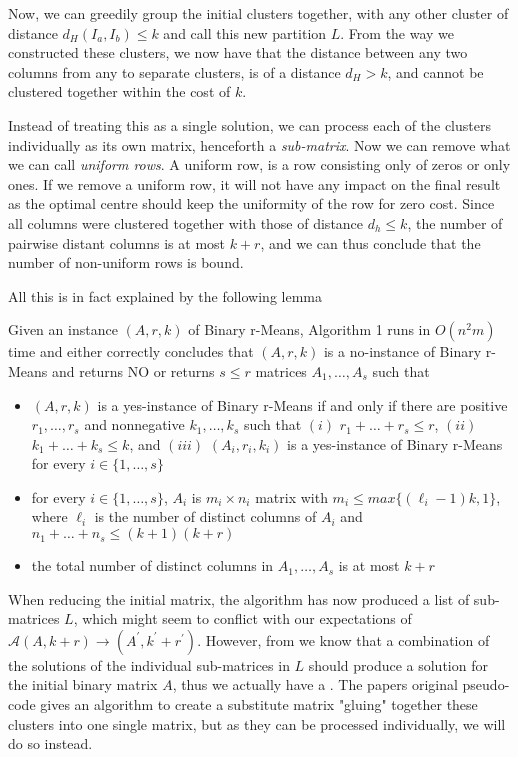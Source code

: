 \documentclass[a4paper]{article}
\begin{document}
Now, we can greedily group the initial clusters together, with any other cluster of distance $d_H(I_a,I_b) \leq k$ and call this new
partition $L$. From the way we constructed these clusters, we now have that the distance between any two columns from any to separate
clusters, is of a distance $d_H > k$, and cannot be clustered together within the cost of $k$.

Instead of treating this as a single solution, we can process each of the clusters individually as its own matrix, henceforth
a \textit{sub-matrix}. Now we can remove what we can call \textit{uniform rows}. A uniform row, is a row consisting
only of zeros or only ones. If we remove a uniform row, it will not have any impact on the final result as the optimal centre
should keep the uniformity of the row for zero cost. Since all columns were clustered together with those of distance $d_h \leq k$,
the number of pairwise distant columns is at most $k+r$, and we can thus conclude that the number of non-uniform rows is bound.

All this is in fact explained by the following lemma
\begin{theoremlemma}{\cite[Lemma 5]{fomin_golovach_panolan_2020}}
    Given an instance $(A,r,k)$ of Binary r-Means, Algorithm 1 runs in $O(n^2m)$ time
    and either correctly concludes that $(A,r,k)$ is a no-instance of Binary r-Means and
    returns NO or returns $s \leq r$ matrices $A_1, \dots, A_s$ such that
    \begin{itemize}
        \item $(A,r,k)$ is a yes-instance of Binary r-Means if and only if there are positive
              $r_1,\dots,r_s$ and nonnegative $k_1,\dots,k_s$ such that $(i)$ $r_1 + \dots + r_s \leq r$,
              $(ii)$ $k_1 + \dots + k_s \leq k$, and $(iii)$ $(A_i,r_i,k_i)$ is a yes-instance of Binary
              r-Means for every $i\in\{1,\dots,s\}$
        \item for every $i\in\{1,\dots,s\}$, $A_i$ is $m_i \times n_i$ matrix with
              $m_i \leq max\{(\ell_i - 1)k, 1\}$, where $\ell_i$ is the number of distinct columns
              of $A_i$ and $n_1 + \dots + n_s \leq (k+1)(k+r)$
        \item the total number of distinct columns in $A_1,\dots,A_s$ is at most $k+r$
    \end{itemize}
    \label{lem:5}
\end{theoremlemma}



When reducing the initial matrix, the algorithm has now produced a list of sub-matrices $L$, which might seem to conflict with our expectations
of $\mathcal{A}(A,k+r) \rightarrow (A^\prime,k^\prime+r^\prime)$. However, from  we know that a combination of the solutions of the
individual sub-matrices in $L$ should produce a solution for the initial binary matrix $A$, thus we actually have a .
The papers original pseudo-code \cite{fomin_golovach_panolan_2020} gives an algorithm to create a substitute matrix "gluing" together these clusters into
one single matrix, but as they can be processed individually, we will do so instead.
\end{document}
